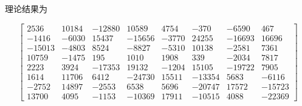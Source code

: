 \documentclass[UTF8]{ctexart}
\begin{document}
理论结果为

\begin{equation}
\left[
\begin{array}{cccccccc}
    2536  &  10184 & -12880 &  10589 &  4754  & -370   & -6590  &  467   \\
   -1416  & -6030  &  15437 & -15656 & -3770  &  24255 & -16693 &  16696 \\
   -15013 & -4803  &  8524  & -8827  & -5310  &  10138 & -2581  &  7361  \\
    10759 & -1475  &  195   &  1010  &  1908  &  339   & -2034  &  7817  \\
    2223  &  3924  & -17353 &  19132 & -1204  &  15105 & -19722 &  7905  \\
    1614  &  11706 &  6412  & -24730 &  15511 & -13354 &  5683  & -6116  \\
   -2752  &  14897 & -2553  &  6538  &  5696  & -20747 &  17572 & -15723 \\
    13700 &  4095  & -1153  & -10369 &  17911 & -10515 &  4088  & -22369
\end{array}
\right]
\end{equation}
\end{document}
